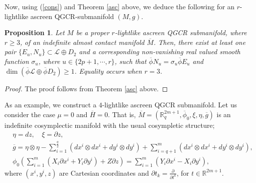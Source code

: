 \documentclass[reqno, 12pt]{amsart}
\numberwithin{equation}{section}
\newtheorem{proposition}[theorem]{Proposition}
\begin{document}
 Now, using (\ref{cons}) and Theorem \ref{asc} above, we deduce the following for an $r$-lightlike ascreen QGCR-submanifold $(M,g)$.
 \begin{proposition}\label{prop}
 Let $M$ be a proper $r$-lightlike ascreen QGCR submanifold, where $r\ge 3$, of an indefinite almost contact manifold $\overline{M}$. Then, there exist at least one  pair $\{E_{u},N_{u}\}\subset \mathcal{L}\oplus D_{2}$ and a corresponding non-vanishing real valued smooth function $\sigma_{u}$, where $u\in\{2p+1,\cdots,r\}$, such that $\overline{\phi}N_{u}=\sigma_{u}\overline{\phi}E_{u}$ and $\dim( \overline{\phi}\mathcal{L}\oplus  \overline{\phi}D_{2})\ge1$. Equality occurs when $r=3$.
\end{proposition}
\begin{proof}
The proof follows from Theorem \ref{asc} above.
\end{proof}
As an example, we construct a $4$-lightlike ascreen QGCR submanifold. Let us consider the case $\mu=0$ and $\overline{H}=0$. That is,  $\overline{M}=(\mathbb{R}_{q}^{2m+1}, \overline{\phi}_{0} ,\xi, \eta, \overline{g})$ is an indefinite cosymplectic manifold with the usual cosympletic structure;
\begin{align*}
   &\eta = dz,\quad\xi=\partial z,\\
   &\overline{g} =\eta\otimes\eta-\sum_{i=1}^{\frac{q}{2}}(dx^i\otimes dx^i+dy^i\otimes dy^i)+\sum_{i=q+1}^{m}(dx^i\otimes dx^i+dy^i\otimes dy^i),\\
   &\phi_0 (\sum_{i=1}^m(X_i\partial x^i+Y_i\partial y^i)+Z\partial z )=\sum_{i=1}^m(Y_i\partial x^i-X_i\partial y^i),
\end{align*}
where $(x^{i} , y^{i} , z)$ are Cartesian coordinates and $\partial t_{k} = \frac{\partial}{\partial t^{k}}$, for $t\in\mathbb{R}^{2m+1}$.
\end{document}
